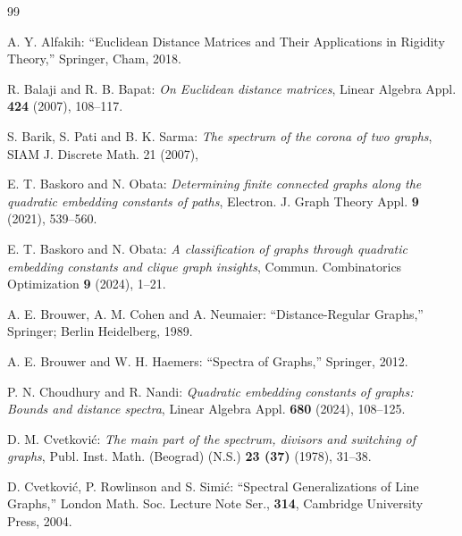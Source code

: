 \documentclass[12pt,a4paper]{article}
\newcommand{\1}{{\bm 1}}
\numberwithin{equation}{section}
\begin{document}
\begin{thebibliography}{99}

A. Y. Alfakih:
``Euclidean Distance Matrices and Their Applications
in Rigidity Theory,'' Springer, Cham, 2018. 

R. Balaji and R. B. Bapat:
\textit{On Euclidean distance matrices},
Linear Algebra Appl. {\bfseries 424} (2007), 108--117.


S. Barik, S. Pati and B. K. Sarma:
\textit{The spectrum of the corona of two graphs},
SIAM J. Discrete Math. 21 (2007),


E. T. Baskoro and N. Obata:
\textit{Determining finite connected graphs 
along the quadratic embedding constants of paths},
Electron. J. Graph Theory Appl. {\bfseries 9} (2021), 539--560.

E. T. Baskoro and N. Obata:
\textit{A classification of graphs through quadratic embedding
constants and clique graph insights},
Commun. Combinatorics Optimization {\bfseries 9} (2024), 1--21.

A. E. Brouwer, A. M. Cohen and A. Neumaier:
``Distance-Regular Graphs,'' Springer; Berlin Heidelberg, 1989.

A. E. Brouwer and W. H. Haemers:
``Spectra of Graphs,'' Springer, 2012.

P. N. Choudhury and R. Nandi:
\textit{Quadratic embedding constants of graphs: Bounds
and distance spectra},
Linear Algebra Appl. {\bfseries 680} (2024), 108--125.

D. M. Cvetkovi\'c:
\textit{The main part of the spectrum, 
divisors and switching of graphs},
Publ. Inst. Math. (Beograd) (N.S.) {\bfseries 23 (37)} (1978), 31--38.

D. Cvetkovi\'c, P. Rowlinson and S. Simi\'c:
``Spectral Generalizations of Line Graphs,''
London Math. Soc. Lecture Note Ser., {\bfseries 314},
Cambridge University Press, 2004.


\end{thebibliography}
\end{document}
